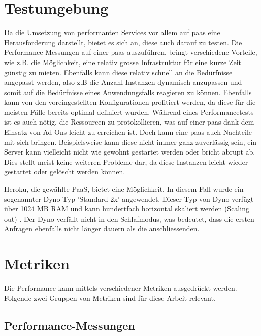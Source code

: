 \documentclass[main.tex]{subfiles}
\begin{document}
\section{Testumgebung}
Da die Umsetzung von performanten Services vor allem auf \acrfull{paas} eine Herausforderung darstellt, bietet es sich an, diese auch darauf zu testen.
Die Performance-Messungen auf einer \acrshort{paas} auszuführen, bringt verschiedene Vorteile, wie z.B. die Möglichkeit, eine relativ grosse Infrastruktur für eine kurze Zeit günstig zu mieten. Ebenfalls kann diese relativ schnell an die Bedürfnisse angepasst werden, also z.B die Anzahl Instanzen dynamisch anzupassen und somit auf die Bedürfnisse eines Anwendungsfalls reagieren zu können. Ebenfalls kann von den voreingestellten Konfigurationen profitiert werden, da diese für die meisten Fälle bereits optimal definiert wurden. Während eines Performancetests ist es auch nötig, die Ressourcen zu protokollieren, was auf einer \acrshort{paas} dank dem Einsatz von Ad-Ons leicht zu erreichen ist. Doch kann eine \acrshort{paas} auch Nachteile mit sich bringen. Beispielsweise kann diese nicht immer ganz zuverlässig sein, ein Server kann vielleicht nicht wie gewohnt gestartet werden oder bricht abrupt ab. Dies stellt meist keine weiteren Probleme dar, da diese Instanzen leicht wieder gestartet oder gelöscht werden können.\cite[Kap.~3]{molyneaux2014art} 


Heroku, die gewählte PaaS, bietet eine Möglichkeit. In diesem Fall wurde ein sogenannter Dyno Typ 'Standard-2x' angewendet. Dieser Typ von Dyno verfügt über 1024 MB RAM und kann hundertfach horizontal skaliert werden (Scaling out) \cite[Kap.~2]{middleton_2014}. Der Dyno verfällt nicht in den Schlafmodus, was bedeutet, dass die ersten Anfragen ebenfalls nicht länger dauern als die anschliessenden. 



\section{Metriken}
Die Performance kann mittels verschiedener Metriken ausgedrückt werden. Folgende zwei Gruppen von Metriken sind für diese Arbeit relevant.

\subsection{Performance-Messungen}
\end{document}
